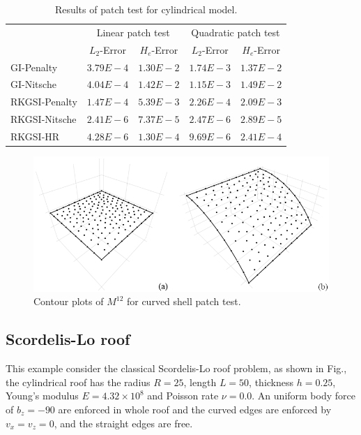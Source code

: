 \begin{table}[h!]
\centering
\caption{Results of patch test for cylindrical model.}\label{ptt2}
\begin{tabular}{lcccc}
\toprule
 & \multicolumn{2}{c}{Linear patch test} & \multicolumn{2}{c}{Quadratic patch test} \\ \cline{2-5}
 & $L_2$-Error & $H_e$-Error & $L_2$-Error & $H_e$-Error \\
    \midrule
    GI-Penalty & $3.79E-4$ & $1.30E-2$ & $1.74E-3$ & $1.37E-2$ \\
    GI-Nitsche & $4.04E-4$ & $1.42E-2$ & $1.15E-3$ & $1.49E-2$ \\
    RKGSI-Penalty & $1.47E-4$ & $5.39E-3$ & $2.26E-4$ & $2.09E-3$ \\
    RKGSI-Nitsche & $2.41E-6$ & $7.37E-5$ & $2.47E-6$ & $2.89E-5$ \\
    RKGSI-HR & $4.28E-6$ & $1.30E-4$ & $9.69E-6$ & $2.41E-4$ \\
    \bottomrule
\end{tabular}
\end{table}

\begin{figure}[h!]
\centering
\includegraphics[width=\textwidth]{figures/patchtest_msh}
\caption{Contour plots of $M^{12}$ for curved shell patch test.}\label{ptf2}
\end{figure}

\subsection{Scordelis-Lo roof}
This example consider the classical Scordelis-Lo roof problem, as shown in Fig., the cylindrical roof has the radius $R=25$, length $L=50$, thickness $h=0.25$, Young's modulus $E=4.32\times 10^8$ and Poisson rate $\nu=0.0$. An uniform body force of $b_z = -90$ are enforced in whole roof and the curved edges are enforced by $v_x=v_z=0$, and the straight edges are free.

